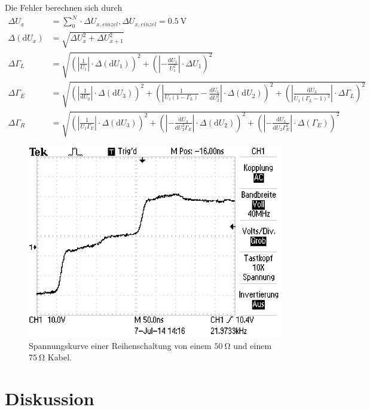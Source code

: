 Die Fehler berechnen sich durch
\begin{align*}
	\Delta U_x &= \sum_0^N \cdot \Delta U_{x,einzel} , \Delta U_{x,einzel} = \SI{0.5}{\volt}\\
	\Delta (\text{d} U_x) &= \sqrt{\Delta U_x^2 + \Delta U_{x+1}^2}\\
	\Delta \Gamma_L &= \sqrt{\left(|\frac{1}{U_1}|\cdot\Delta(\text{d}U_1)\right)^2 + \left(|-\frac{\text{d}U_1}{U_1^2}| \cdot \Delta U_1 \right)^2}\\
	\Delta \Gamma_E &= \sqrt{\left(|\frac{1}{\text{d}U_2}| \cdot \Delta (\text{d}U_3) \right)^2  + \left(|\frac{1}{U_1(1-\Gamma_L)}-\frac{\text{d}U_1}{\text{d}U_2^2}| \cdot \Delta (\text{d}U_2) \right)^2 + \left(|\frac{\text{d}U_2}{U_1(\Gamma_L-1)^2}| \cdot \Delta \Gamma_L\right)^2}\\
	\Delta \Gamma_R &= \sqrt{\left(|\frac{1}{U_1\Gamma_E}|\cdot\Delta(\text{d}U_3)\right)^2 + \left(|-\frac{\text{d}U_3}{\text{d}U_2^2 \Gamma_E}| \cdot \Delta(\text{d}U_2) \right)^2 + \left(|-\frac{\text{d}U_3}{\text{d}U_2 \Gamma_E^2}| \cdot \Delta(\Gamma_E) \right)^2}
\end{align*}

\begin{figure}
	\centering
	\includegraphics[width = 12cm]{data/e/ALL0008/F0008TEK.JPG}
	\caption{Spannungskurve einer Reihenschaltung von einem $\SI{50}{\ohm}$ und einem $\SI{75}{\ohm}$ Kabel.}
	\label{fig_abs10}
\end{figure}

\FloatBarrier
\section{Diskussion} %
\label{sec:diskussion}

